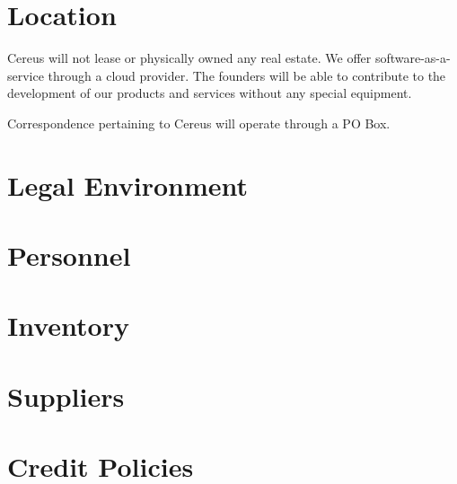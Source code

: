 \section{Location}

Cereus will not lease or physically owned any real estate. We offer software-as-a-service through a cloud provider. The founders will be able to contribute to the development of our products and services without any special equipment. 

Correspondence pertaining to Cereus will operate through a PO Box. 

\section{Legal Environment}



\section{Personnel}

\section{Inventory}

\section{Suppliers}

\section{Credit Policies}